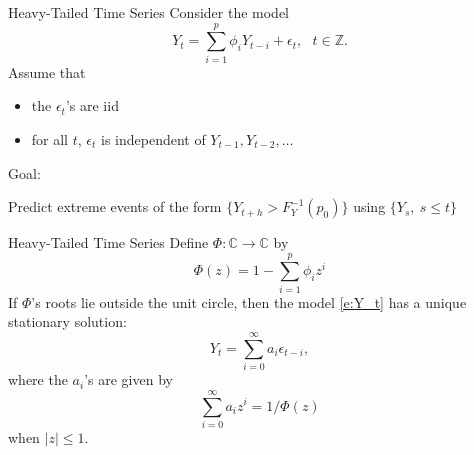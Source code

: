 \documentclass{beamer}
\def\C{\mathbb C}
\def\P{\mathbb P}
\def\Z{{\mathbb Z}}
\begin{document}
\begin{frame}{Heavy-Tailed Time Series}
    Consider the model
    \begin{equation}\label{e:Y_t}
        Y_t  = \sum_{i=1}^{p} \phi_i Y_{t-i} + \epsilon_t,\ \ \ t\in \Z.
    \end{equation}
    Assume that
    \begin{itemize}
        \item the $\epsilon_t$'s are iid
        \item for all $t$, $\epsilon_t$ is independent of $Y_{t - 1}, Y_{t - 2}, \ldots$
    \end{itemize}

    \medskip

    Goal:
    \begin{center}
        Predict extreme events of the form $\{Y_{t + h} > F_Y^{-1}(p_0)\}$ using $\{Y_s, \ s \le t\}$    
    \end{center}
\end{frame}

\begin{frame}{Heavy-Tailed Time Series}
    Define $\Phi : \C \to \C$ by
    \[
    \Phi(z) = 1 - \sum_{i = 1}^p \phi_i z^i
    \]
    If $\Phi$'s roots lie outside the unit circle, then the model \eqref{e:Y_t} has a unique stationary solution:
    \begin{equation}\label{e:Y-as-a-moving-average}
        Y_t = \sum_{i = 0}^\infty a_i \epsilon_{t - i},
    \end{equation}
    where the $a_i$'s are given by
    \[
    \sum_{i = 0}^\infty a_i z^i = 1 / \Phi(z)
    \]
    when $|z| \le 1$.
\end{frame}

\end{document}

